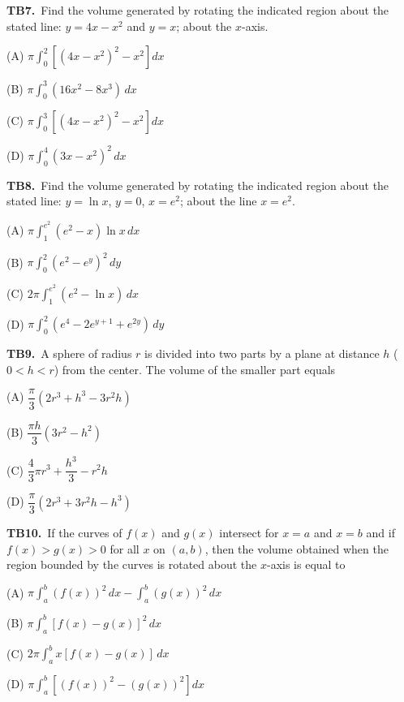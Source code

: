 \documentclass[11pt]{article}
\begin{document}
\bigskip\noindent\textbf{TB7.}\ Find the volume generated by rotating the indicated region about the stated line: $y=4x-x^2$ and $y=x$; about the $x$-axis.
\begin{list}{}{\setlength{\leftmargin}{3em}\setlength{\labelwidth}{2.5em}\setlength{\itemsep}{0pt}\setlength{\topsep}{2pt}}
\item[(A)] $\displaystyle \pi\int_0^2 \left[(4x-x^2)^2-x^2\right] dx$
\item[(B)] $\displaystyle \pi\int_0^3 (16x^2-8x^3)\,dx$
\item[(C)] $\displaystyle \pi\int_0^3 \left[(4x-x^2)^2-x^2\right] dx$
\item[(D)] $\displaystyle \pi\int_0^4 (3x-x^2)^2\,dx$
\end{list}

\bigskip\noindent\textbf{TB8.}\ Find the volume generated by rotating the indicated region about the stated line: $y=\ln x$, $y=0$, $x=e^2$; about the line $x=e^2$.
\begin{list}{}{\setlength{\leftmargin}{3em}\setlength{\labelwidth}{2.5em}\setlength{\itemsep}{0pt}\setlength{\topsep}{2pt}}
\item[(A)] $\displaystyle \pi\int_1^{e^2} (e^2-x)\ln x\,dx$
\item[(B)] $\displaystyle \pi\int_0^2 (e^2-e^y)^2\,dy$
\item[(C)] $\displaystyle 2\pi\int_1^{e^2} (e^2-\ln x)\,dx$
\item[(D)] $\displaystyle \pi\int_0^2 (e^4-2e^{y+1}+e^{2y})\,dy$
\end{list}

\bigskip\noindent\textbf{TB9.}\ A sphere of radius $r$ is divided into two parts by a plane at distance $h$ ($0<h<r$) from the center. The volume of the smaller part equals
\begin{list}{}{\setlength{\leftmargin}{3em}\setlength{\labelwidth}{2.5em}\setlength{\itemsep}{0pt}\setlength{\topsep}{2pt}}
\item[(A)] $\dfrac{\pi}{3}(2r^3+h^3-3r^2h)$
\item[(B)] $\dfrac{\pi h}{3}(3r^2-h^2)$
\item[(C)] $\dfrac{4}{3}\pi r^3+\dfrac{h^3}{3}-r^2h$
\item[(D)] $\dfrac{\pi}{3}(2r^3+3r^2h-h^3)$
\end{list}

\bigskip\noindent\textbf{TB10.}\ If the curves of $f(x)$ and $g(x)$ intersect for $x=a$ and $x=b$ and if $f(x)>g(x)>0$ for all $x$ on $(a,b)$, then the volume obtained when the region bounded by the curves is rotated about the $x$-axis is equal to
\begin{list}{}{\setlength{\leftmargin}{3em}\setlength{\labelwidth}{2.5em}\setlength{\itemsep}{0pt}\setlength{\topsep}{2pt}}
\item[(A)] $\displaystyle \pi\int_a^b (f(x))^2\,dx - \int_a^b (g(x))^2\,dx$
\item[(B)] $\displaystyle \pi\int_a^b [f(x)-g(x)]^2\,dx$
\item[(C)] $\displaystyle 2\pi\int_a^b x[f(x)-g(x)]\,dx$
\item[(D)] $\displaystyle \pi\int_a^b \left[(f(x))^2-(g(x))^2\right] dx$
\end{list}
\end{document}
